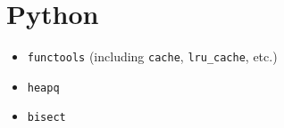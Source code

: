 \section{Python}%
\label{sec:standard-implementations--python}


{\color{red}
\begin{itemize}
    \item \texttt{functools} (including \texttt{cache}, \texttt{lru\_cache}, etc.)
    \item \texttt{heapq}
    \item \texttt{bisect}
\end{itemize}
}


